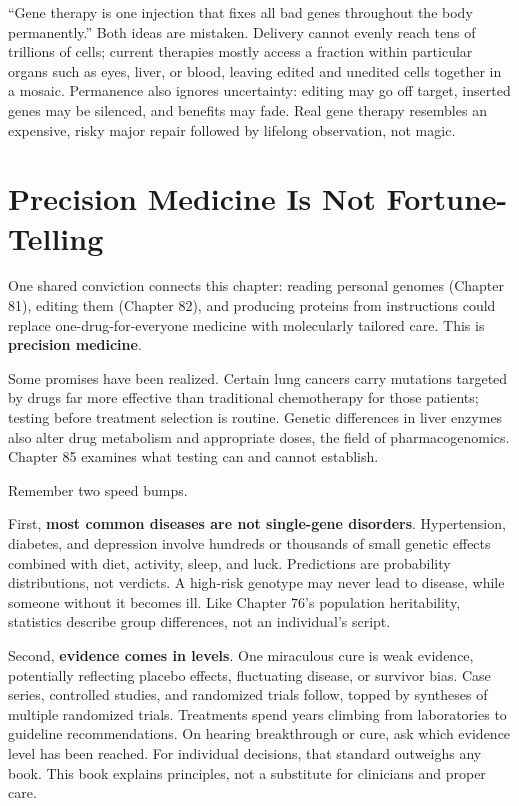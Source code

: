 \begin{wuqu}
``Gene therapy is one injection that fixes all bad genes throughout the body permanently.'' Both ideas are mistaken. Delivery cannot evenly reach tens of trillions of cells; current therapies mostly access a fraction within particular organs such as eyes, liver, or blood, leaving edited and unedited cells together in a mosaic. Permanence also ignores uncertainty: editing may go off target, inserted genes may be silenced, and benefits may fade. Real gene therapy resembles an expensive, risky major repair followed by lifelong observation, not magic.
\end{wuqu}

\section{Precision Medicine Is Not Fortune-Telling}

One shared conviction connects this chapter: reading personal genomes (Chapter 81), editing them (Chapter 82), and producing proteins from instructions could replace one-drug-for-everyone medicine with molecularly tailored care. This is \textbf{precision medicine}.

Some promises have been realized. Certain lung cancers carry mutations targeted by drugs far more effective than traditional chemotherapy for those patients; testing before treatment selection is routine. Genetic differences in liver enzymes also alter drug metabolism and appropriate doses, the field of pharmacogenomics. Chapter 85 examines what testing can and cannot establish.

Remember two speed bumps.

First, \textbf{most common diseases are not single-gene disorders}. Hypertension, diabetes, and depression involve hundreds or thousands of small genetic effects combined with diet, activity, sleep, and luck. Predictions are probability distributions, not verdicts. A high-risk genotype may never lead to disease, while someone without it becomes ill. Like Chapter 76's population heritability, statistics describe group differences, not an individual's script.

Second, \textbf{evidence comes in levels}. One miraculous cure is weak evidence, potentially reflecting placebo effects, fluctuating disease, or survivor bias. Case series, controlled studies, and randomized trials follow, topped by syntheses of multiple randomized trials. Treatments spend years climbing from laboratories to guideline recommendations. On hearing breakthrough or cure, ask which evidence level has been reached. For individual decisions, that standard outweighs any book. This book explains principles, not a substitute for clinicians and proper care.


